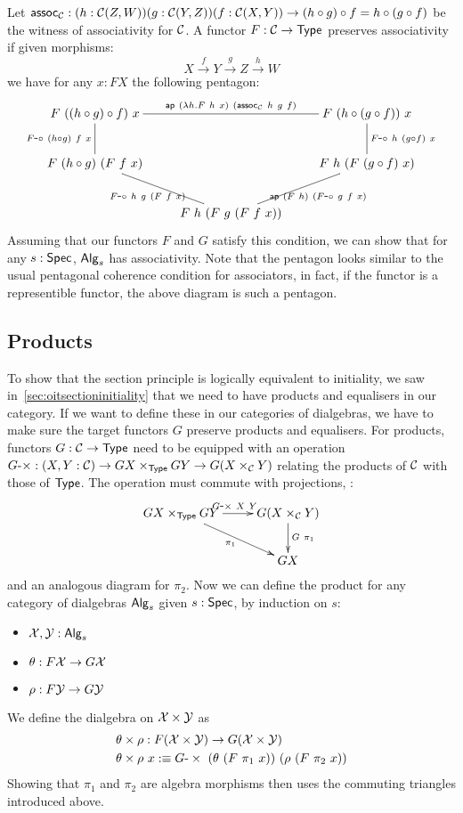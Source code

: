\documentclass[a4paper,10pt]{report}
\begin{document}
Let
$\mathsf{assoc}_{\mathcal{C}} : (h : \mathcal{C}(Z,W)) (g : \mathcal{C}(Y,Z)) (f : \mathcal{C}(X,Y)) \to (h \circ
g) \circ f = h \circ (g \circ f)$
be the witness of associativity for $\mathcal{C}$. A functor $F : \mathcal{C} \to \mathsf{Type}$
preserves associativity if given morphisms:
$$
X \overset{f}\to Y \overset{g}\to Z \overset{h}\to W
$$
we have for any $x : FX$ the following pentagon:
$$
\xymatrix{
F\ ((h \circ g) \circ f)\ x 
  \ar@{-}[rr]^{\ap\ (\lambda h . F\ h\ x)\ (\assoc_{\C}\ h\ g\ f)} 
  \ar@{-}[d]_{\Fcomp\ (h \circ g)\ f\ x}
&&F\ (h \circ (g \circ f))\ x 
  \ar@{-}[d]^{\Fcomp\ h\ (g \circ f)\ x}
  \\
F\ (h \circ g)\ (F\ f\ x)
  \ar@{-}[dr]_{\Fcomp\ h\ g\ (F\ f\ x)}
&&F\ h\ (F\ (g \circ f)\ x) 
  \ar@{-}[dl]^{\ap\ (F\ h)\ (\Fcomp\ g\ f\ x)}
  \\
&F\ h\ (F\ g\ (F\ f\ x))&
}
$$
Assuming that our functors $F$ and $G$ satisfy this condition, we can
show that for any $s : \mathsf{Spec}$, $\mathsf{Alg}_s$ has associativity. Note that
the pentagon looks similar to the usual pentagonal coherence condition
for associators, in fact, if the functor is a representible functor,
the above diagram is such a pentagon.

\subsection{Products}

To show that the section principle is logically equivalent to
initiality, we saw in~\cref{sec:oitsectioninitiality} that we need to
have products and equalisers in our category. If we want to define
these in our categories of dialgebras, we have to make sure the target
functors $G$ preserve products and equalisers. For products, functors
$G : \mathcal{C} \to \mathsf{Type}$ need to be equipped with an operation
$G\mbox{-}\times : (X, Y : \mathcal{C}) \to GX \times_{\mathsf{Type}} GY \to G(X \times_{\mathcal{C}}
Y)$
relating the products of $\mathcal{C}$ with those of $\mathsf{Type}$. The operation
must commute with projections, \ie:
$$
\xymatrix{
GX \times_{\Type} GY 
 \ar[r]^{\Gtimes\ X\ Y} 
 \ar[rd]_{\pi_1}
&G(X \times_{\C} Y)
 \ar[d]^{G\ \pi_1} \\
&GX
}
$$
and an analogous diagram for $\pi_2$. Now we can define the product
for any category of dialgebras $\mathsf{Alg}_s$ given $s : \mathsf{Spec}$, by induction
on $s$:
%
\begin{itemize}
\item $\mathcal{X}, \mathcal{Y} : \mathsf{Alg}_s$
\item $\theta : F \mathcal{X} \to G \mathcal{X}$
\item $\rho : F \mathcal{Y} \to G \mathcal{Y}$
\end{itemize}
%
We define the dialgebra on $\mathcal{X} \times \mathcal{Y}$ as
\begin{align*}
&\theta \times \rho : F (\alg{X} \times \alg{Y}) \to G (\alg{X} \times \alg{Y}) \\
&\theta \times \rho\ x \ddefeq  \Gtimes\ (\theta\ (F\ \pi_1\ x))\ (\rho\ (F\ \pi_2\ x))
\end{align*}
Showing that $\pi_1$ and $\pi_2$ are algebra morphisms then uses the
commuting triangles introduced above.
\end{document}
